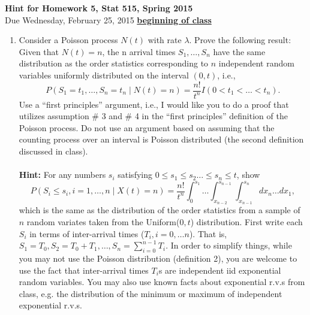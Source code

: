 \documentclass{article}
\begin{document}
\begin{center}
\Large
{\bf Hint for Homework 5, Stat 515, Spring 2015}\\
\normalsize
Due Wednesday, February 25, 2015 \underline{{\bf beginning of class}}\\
\end{center}

\begin{enumerate}
\item Consider a Poisson process $N(t)$ with rate $\lambda$. Prove the
  following result: Given that $N(t)=n$, the n arrival times
  $S_1,\dots,S_n$ have the same distribution as the order statistics
  corresponding to $n$ independent random variables uniformly
  distributed on the interval $(0,t)$, i.e., $$P(S_1=t_1,\dots,S_n=t_n
  \mid N(t)=n)=\frac{n!}{t^n} I(0<t_1<\dots <t_n).  $$ Use a ``first
  principles'' argument, i.e., I would like you to do a proof that
  utilizes assumption \# 3 and \# 4 in the ``first principles'' definition
  of the Poisson process. Do not use an argument based on assuming
  that the counting process over an interval is Poisson distributed
  (the second definition discussed in class).\\\\
{\bf Hint:} For any numbers $s_i$ satisfying $0\leq s_1\leq s_2\dots \leq s_n\leq t$, show 
$$P(S_i\leq s_i, i=1,\dots, n\mid X(t)=n) = \frac{n!}{t^n} \int_0^{s_1}\hdots\int_{x_{n-2}}^{s_{n-1}} \int_{x_{n-1}}^{s_n} dx_n\hdots d x_1, $$
which is the same as the distribution of the order statistics from a
sample of $n$ random variates taken from the Uniform($0,t$)
distribution. First write each $S_i$ in terms of inter-arrival times
($T_i, i=0, \dots n$). That is, $S_1= T_0, S_2 = T_0 + T_1, \hdots,
S_n = \sum_{i=0}^{n-1} T_i$. In order to simplify things, while you
may not use the Poisson distribution (definition 2), you are welcome
to use the fact that inter-arrival times $T_i$s are independent iid
exponential random variables. You may also use known facts about
exponential r.v.s from class, e.g. the distribution of the minimum or
maximum of independent exponential r.v.s.

\end{enumerate}
\end{document}
